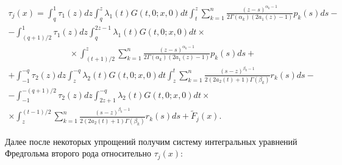 \begin{multline}

\tau _j (x) =  \int _q^1 {\tau _1(z)dz}  \int _q^z {{\lambda _1}(t)G(t, 0; x, 0)dt}  \int _t^z {\sum\limits_{k = 1}^n {\frac{{{{(z - s)}^{{\alpha _k} - 1}}}}{{2\Gamma ({\alpha _k})\left( {2{a_1}(z) - 1} \right)}}} {p_k}(s)ds}  - 

\\

 -  \int _{({{q + 1}})/{2}}^1 {\tau _1(z)dz}  \int _q^{2z - 1} {\lambda _1}(t)G(t, 0; x, 0 )dt 

\times \hspace{3cm}

 \\

 \hspace{3cm}

\times 

  \int _{({{t + 1}})/{2}}^z {\sum\limits_{k = 1}^n {\frac{{{{(z - s)}^{{\alpha _k} - 1}}}}{{2\Gamma ({\alpha _k})\left( {2{a_1}(z) - 1} \right)}}} {p_k}(s)ds}  + 

 \\

 +  \int _{ - 1}^{ - q} {\tau _2(z)dz}  \int _z^{ - q} {\lambda _2}(t)G(t, 0; x, 0)dt  \int _z^t {\sum\limits_{k = 1}^n {\frac{{{{(s - z)}^{{\beta _k} - 1}}}}{{2(2{a_2}(t) + 1)\Gamma ({\beta _k})}}{r_k}(s)} ds}  - 

\\

-  \int _{ - 1}^{ - ({{q + 1}})/{2}} {\tau _2(z)dz}  \int _{2z + 1}^{ - q} {{\lambda _2}(t)G(t, 0; x, 0)dt}  \times 

 \hspace{2cm}

\\

\times

 \int _z^{({{t - 1}})/{2}} {\sum\limits_{k = 1}^n {\frac{{{{(s - z)}^{{\beta _k} - 1}}}}{{2(2{a_2}(t) + 1)\Gamma ({\beta _k})}}{r_k}(s)} ds}  + {\tilde F_j}(x).

\end{multline}

Далее после некоторых упрощений получим систему интегральных уравнений Фредгольма второго рода относительно $\tau _j(x)$:

